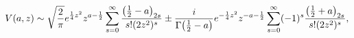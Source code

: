 \[\mathop{V\/}\nolimits\!\left(a,z\right)\sim\sqrt{\frac{2}{\pi}}e^{\frac{1}{4}z%
^{2}}z^{a-\frac{1}{2}}\sum_{s=0}^{\infty}\frac{\left(\tfrac{1}{2}-a\right)_{2s%
}}{s!(2z^{2})^{s}}\pm\frac{i}{\mathop{\Gamma\/}\nolimits\!\left(\tfrac{1}{2}-a%
\right)}e^{-\frac{1}{4}z^{2}}z^{-a-\frac{1}{2}}\sum_{s=0}^{\infty}(-1)^{s}%
\frac{\left(\tfrac{1}{2}+a\right)_{2s}}{s!(2z^{2})^{s}},\]